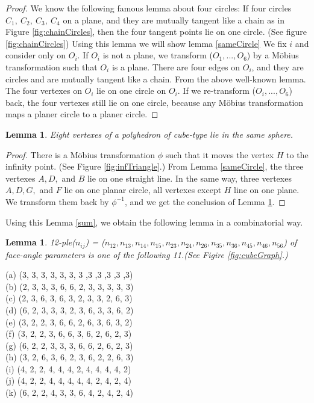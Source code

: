 \documentclass[suppldata, dvipdfmx]{interact}
\theoremstyle{plain}%
\newtheorem{lemma}[theorem]{Lemma}
\theoremstyle{definition}
\theoremstyle{remark}
\theoremstyle{problemstyle}
\begin{document}
\begin{proof}
 We know the following famous lemma about four circles: If four circles 
 $C_1,~C_2,~C_3,~C_4$ on a plane, and they are mutually tangent like a
 chain as in Figure \ref{fig:chainCircles}, then the four tangent points lie on one circle.
 (See figure \ref{fig:chainCircles}) Using this lemma we will show lemma \ref{sameCircle} We fix $i$ and
 consider only on $O_i$. If $O_i$ is not a plane, we transform 
 ($O_1, ..., O_6$) by a M\"obius transformation such that $O_i$ is a
 plane. There are four edges on $O_i$, and they are circles and are
 mutually tangent like a chain. From the above well-known lemma. The
 four vertexes on $O_i$ lie on one circle on $O_i$. If we re-transform
 ($O_i, ..., O_6$) back, the four vertexes still lie on one circle,
 because any M\"obius transformation maps a planer circle to a planer circle.
\end{proof}

\begin{lemma}\label{eightVertexes}
 Eight vertexes of a polyhedron of cube-type lie in the same sphere.
\end{lemma}

\begin{proof}
 There is a M\"obius transformation $\phi$ such that it moves the vertex
 $H$ to the infinity point. (See Figure \ref{fig:infTriangle}.) From Lemma \ref{sameCircle}, the three
 vertexes $A, D,$ and $B$ lie on one straight line. In the same way,
 three vertexes $A, D, G,$ and $F$ lie on one planar circle, all vertexes
 except $H$ line on one plane. We transform them back by $\phi^{-1}$, and
 we get the conclusion of Lemma \ref{eightVertexes}.
\end{proof}


 Using this Lemma \ref{sum}, we obtain the following lemma in a combinatorial way.
\begin{lemma}\label{combination}
 12-ple($n_{ij}$) = ($n_{12}, n_{13}, n_{14}, n_{15}, n_{23}, n_{24},
 n_{26}, n_{35}, n_{36}, n_{45}, n_{46}, n_{56}$) of face-angle
 parameters is one of the following 11.(See Figire \ref{fig:cubeGraph}.)
\end{lemma}

\noindent
(a) (3, 3, 3, 3, 3, 3, 3 ,3 ,3 ,3 ,3 ,3)\\
(b) (2, 3, 3, 3, 6, 6, 2, 3, 3, 3, 3, 3)\\
(c) (2, 3, 6, 3, 6, 3, 2, 3, 3, 2, 6, 3)\\
(d) (6, 2, 3, 3, 3, 2, 3, 6, 3, 3, 6, 2)\\
(e) (3, 2, 2, 3, 6, 6, 2, 6, 3, 6, 3, 2)\\
(f) (3, 2, 2, 3, 6, 6, 3, 6, 2, 6, 2, 3)\\
(g) (6, 2, 2, 3, 3, 3, 6, 6, 2, 6, 2, 3)\\
(h) (3, 2, 6, 3, 6, 2, 3, 6, 2, 2, 6, 3)\\
(i) (4, 2, 2, 4, 4, 4, 2, 4, 4, 4, 4, 2)\\
(j) (4, 2, 2, 4, 4, 4, 4, 4, 2, 4, 2, 4)\\
(k) (6, 2, 2, 4, 3, 3, 6, 4, 2, 4, 2, 4)\\
\end{document}

